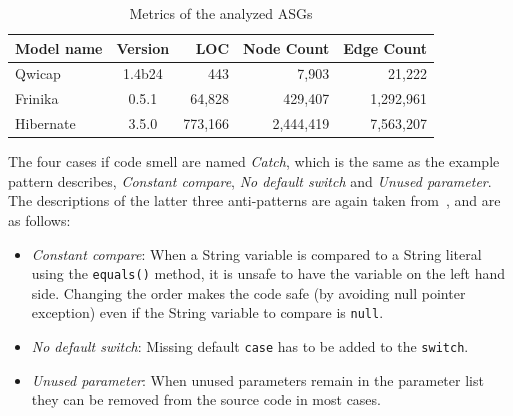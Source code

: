 %		

\begin{table}[htbp]
	\centering
	\begin{tabular}{l|crrr}
		\hline
	 Model name& Version	& LOC		& Node Count 	& Edge Count	\\
		\hline

	Qwicap		 & 1.4b24	& 443 		& 7,903 			& 21,222 		\\			
	Frinika		 & 0.5.1	& 64,828 	& 429,407 		& 1,292,961 		\\		
	Hibernate	 & 3.5.0	& 773,166 	& 2,444,419 		& 7,563,207 	\\	
	\hline
	\end{tabular}
	\caption{Metrics of the analyzed ASGs}
	\label{tab:model-complexity}
\end{table}



The four cases if code smell are named \emph{Catch}, which is the same as the example \catchproblem pattern describes, \emph{Constant compare}, \emph{No default switch} and \emph{Unused parameter}. The descriptions of the latter three anti-patterns are again taken from~\cite{DBLP:journals/infsof/UjhelyiSHCVVF15}, and are as follows:

\begin{itemize}
	\item \emph{Constant compare}: When a String variable is compared
	to a String literal using the \texttt{equals()} method, it is unsafe to have the variable
	on the left hand side. Changing the order makes the code safe (by avoiding
	null pointer exception) even if the String variable to compare is \texttt{null}.
	\item \emph{No default switch}: Missing default \texttt{case} has to be added to the \texttt{switch}.
	\item \emph{Unused parameter}: When unused parameters remain in the parameter list
	they can be removed from the source code in most cases.
\end{itemize}

